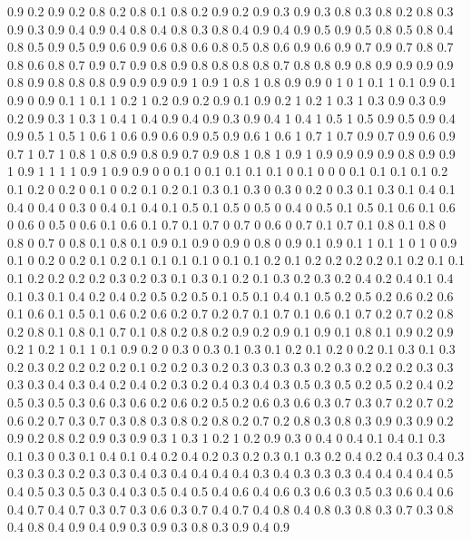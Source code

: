 0.9 0.2
0.9 0.2
0.8 0.2
0.8 0.1
0.8 0.2
0.9 0.2
0.9 0.3
0.9 0.3
0.8 0.3
0.8 0.2
0.8 0.3
0.9 0.3
0.9 0.4
0.9 0.4
0.8 0.4
0.8 0.3
0.8 0.4
0.9 0.4
0.9 0.5
0.9 0.5
0.8 0.5
0.8 0.4
0.8 0.5
0.9 0.5
0.9 0.6
0.9 0.6
0.8 0.6
0.8 0.5
0.8 0.6
0.9 0.6
0.9 0.7
0.9 0.7
0.8 0.7
0.8 0.6
0.8 0.7
0.9 0.7
0.9 0.8
0.9 0.8
0.8 0.8
0.8 0.7
0.8 0.8
0.9 0.8
0.9 0.9
0.9 0.9
0.8 0.9
0.8 0.8
0.8 0.9
0.9 0.9
0.9 1
0.9 1
0.8 1
0.8 0.9
0.9 0
1 0
1 0.1
1 0.1
0.9 0.1
0.9 0
0.9 0.1
1 0.1
1 0.2
1 0.2
0.9 0.2
0.9 0.1
0.9 0.2
1 0.2
1 0.3
1 0.3
0.9 0.3
0.9 0.2
0.9 0.3
1 0.3
1 0.4
1 0.4
0.9 0.4
0.9 0.3
0.9 0.4
1 0.4
1 0.5
1 0.5
0.9 0.5
0.9 0.4
0.9 0.5
1 0.5
1 0.6
1 0.6
0.9 0.6
0.9 0.5
0.9 0.6
1 0.6
1 0.7
1 0.7
0.9 0.7
0.9 0.6
0.9 0.7
1 0.7
1 0.8
1 0.8
0.9 0.8
0.9 0.7
0.9 0.8
1 0.8
1 0.9
1 0.9
0.9 0.9
0.9 0.8
0.9 0.9
1 0.9
1 1
1 1
0.9 1
0.9 0.9
0 0
0.1 0
0.1 0.1
0.1 0.1
0 0.1
0 0
0 0.1
0.1 0.1
0.1 0.2
0.1 0.2
0 0.2
0 0.1
0 0.2
0.1 0.2
0.1 0.3
0.1 0.3
0 0.3
0 0.2
0 0.3
0.1 0.3
0.1 0.4
0.1 0.4
0 0.4
0 0.3
0 0.4
0.1 0.4
0.1 0.5
0.1 0.5
0 0.5
0 0.4
0 0.5
0.1 0.5
0.1 0.6
0.1 0.6
0 0.6
0 0.5
0 0.6
0.1 0.6
0.1 0.7
0.1 0.7
0 0.7
0 0.6
0 0.7
0.1 0.7
0.1 0.8
0.1 0.8
0 0.8
0 0.7
0 0.8
0.1 0.8
0.1 0.9
0.1 0.9
0 0.9
0 0.8
0 0.9
0.1 0.9
0.1 1
0.1 1
0 1
0 0.9
0.1 0
0.2 0
0.2 0.1
0.2 0.1
0.1 0.1
0.1 0
0.1 0.1
0.2 0.1
0.2 0.2
0.2 0.2
0.1 0.2
0.1 0.1
0.1 0.2
0.2 0.2
0.2 0.3
0.2 0.3
0.1 0.3
0.1 0.2
0.1 0.3
0.2 0.3
0.2 0.4
0.2 0.4
0.1 0.4
0.1 0.3
0.1 0.4
0.2 0.4
0.2 0.5
0.2 0.5
0.1 0.5
0.1 0.4
0.1 0.5
0.2 0.5
0.2 0.6
0.2 0.6
0.1 0.6
0.1 0.5
0.1 0.6
0.2 0.6
0.2 0.7
0.2 0.7
0.1 0.7
0.1 0.6
0.1 0.7
0.2 0.7
0.2 0.8
0.2 0.8
0.1 0.8
0.1 0.7
0.1 0.8
0.2 0.8
0.2 0.9
0.2 0.9
0.1 0.9
0.1 0.8
0.1 0.9
0.2 0.9
0.2 1
0.2 1
0.1 1
0.1 0.9
0.2 0
0.3 0
0.3 0.1
0.3 0.1
0.2 0.1
0.2 0
0.2 0.1
0.3 0.1
0.3 0.2
0.3 0.2
0.2 0.2
0.2 0.1
0.2 0.2
0.3 0.2
0.3 0.3
0.3 0.3
0.2 0.3
0.2 0.2
0.2 0.3
0.3 0.3
0.3 0.4
0.3 0.4
0.2 0.4
0.2 0.3
0.2 0.4
0.3 0.4
0.3 0.5
0.3 0.5
0.2 0.5
0.2 0.4
0.2 0.5
0.3 0.5
0.3 0.6
0.3 0.6
0.2 0.6
0.2 0.5
0.2 0.6
0.3 0.6
0.3 0.7
0.3 0.7
0.2 0.7
0.2 0.6
0.2 0.7
0.3 0.7
0.3 0.8
0.3 0.8
0.2 0.8
0.2 0.7
0.2 0.8
0.3 0.8
0.3 0.9
0.3 0.9
0.2 0.9
0.2 0.8
0.2 0.9
0.3 0.9
0.3 1
0.3 1
0.2 1
0.2 0.9
0.3 0
0.4 0
0.4 0.1
0.4 0.1
0.3 0.1
0.3 0
0.3 0.1
0.4 0.1
0.4 0.2
0.4 0.2
0.3 0.2
0.3 0.1
0.3 0.2
0.4 0.2
0.4 0.3
0.4 0.3
0.3 0.3
0.3 0.2
0.3 0.3
0.4 0.3
0.4 0.4
0.4 0.4
0.3 0.4
0.3 0.3
0.3 0.4
0.4 0.4
0.4 0.5
0.4 0.5
0.3 0.5
0.3 0.4
0.3 0.5
0.4 0.5
0.4 0.6
0.4 0.6
0.3 0.6
0.3 0.5
0.3 0.6
0.4 0.6
0.4 0.7
0.4 0.7
0.3 0.7
0.3 0.6
0.3 0.7
0.4 0.7
0.4 0.8
0.4 0.8
0.3 0.8
0.3 0.7
0.3 0.8
0.4 0.8
0.4 0.9
0.4 0.9
0.3 0.9
0.3 0.8
0.3 0.9
0.4 0.9
